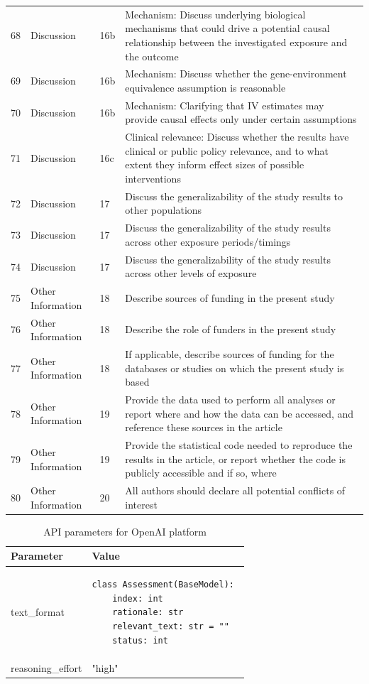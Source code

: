 \begin{longtable}{@{}lll p{9cm}@{}}
68 & Discussion & 16b & Mechanism: Discuss underlying biological mechanisms that could drive a potential causal relationship between the investigated exposure and the outcome \\
69 & Discussion & 16b & Mechanism: Discuss whether the gene-environment equivalence assumption is reasonable \\
70 & Discussion & 16b & Mechanism: Clarifying that IV estimates may provide causal effects only under certain assumptions  \\
71 & Discussion & 16c & Clinical relevance: Discuss whether the results have clinical or public policy relevance, and to what extent they inform effect sizes of possible interventions \\
72 & Discussion & 17 & Discuss the generalizability of the study results to other populations \\
73 & Discussion & 17 & Discuss the generalizability of the study results across other exposure periods/timings \\
74 & Discussion & 17 & Discuss the generalizability of the study results across other levels of exposure \\
75 & Other Information & 18 & Describe sources of funding in the present study \\
76 & Other Information & 18 & Describe  the role of funders in the present study \\
77 & Other Information & 18 & If applicable, describe sources of funding for the databases or studies on which the present study is based \\
78 & Other Information & 19 & Provide the data used to perform all analyses or report where and how the data can be accessed, and reference these sources in the article \\
79 & Other Information & 19 & Provide the statistical code needed to reproduce the results in the article, or report whether the code is publicly accessible and if so, where \\
80 & Other Information & 20 & All authors should declare all potential conflicts of interest \\

\end{longtable}


\begin{table}[h]
    \caption{API parameters for OpenAI platform}
    \begin{tabular}{lp{8cm}}
    \hline
    Parameter & Value \\
    \hline
    text\_format &
\begin{verbatim}
class Assessment(BaseModel): 
    index: int 
    rationale: str 
    relevant_text: str = "" 
    status: int
\end{verbatim} 
\\
    reasoning\_effort & "high" \\
    \hline
    \end{tabular}
    \label{tab:params:openai}
\end{table}

